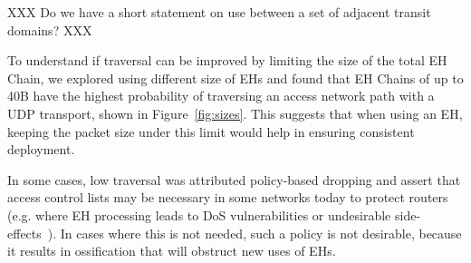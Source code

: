 \documentclass[conference]{IEEEtran}
\begin{document}

XXX Do we have a short statement on use between a set of adjacent transit domains? XXX

To understand if traversal can be improved by limiting the size of the total EH Chain, we explored using different size of EHs and found that EH Chains of up to 40B   have the highest probability of traversing an access network path with a UDP transport, shown in Figure~\ref{fig:sizes}.
 This suggests that when using an EH, keeping the packet size under this limit would help in ensuring consistent deployment.

 In some cases, low traversal was attributed policy-based dropping and assert that access control lists may be necessary in some networks today to protect routers (e.g. where EH processing leads to DoS vulnerabilities or undesirable side-effects~\cite{passive-threats}). In cases where this is not needed, such a policy is not desirable, because it results in ossification that will obstruct new uses of EHs.







\end{document}
